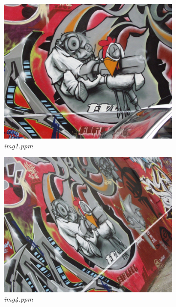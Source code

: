 \documentclass[11pt, a4paper]{article}
\begin{document}
\begin{figure}[H]
	\centering
	\begin{subfigure}[b]{0.32\textwidth}
		\centering
		\includegraphics[width=\textwidth]{./images/Bim1.jpg}
		\caption{{\small \textit{img1.ppm}}}
		\label{fig:h1}
	\end{subfigure}
	\hfill
	\begin{subfigure}[b]{0.32\textwidth}
		\centering
		\includegraphics[width=\textwidth]{./images/Bim4.jpg}
		\caption{{\small \textit{img4.ppm}}}
		\label{fig:h2}
	\end{subfigure}
	\hfill
		\begin{subfigure}[b]{0.32\textwidth}

\end{subfigure}
\end{figure}
\end{document}
